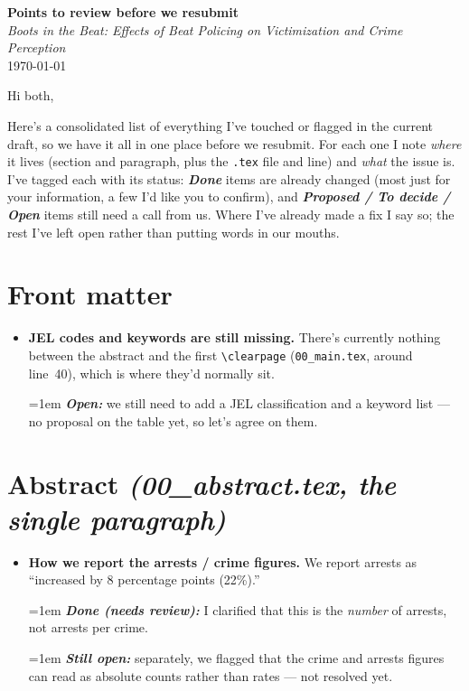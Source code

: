 \documentclass[11pt]{article}
\newcommand{\where}[1]{{\small\textit{#1}}}
\newcommand{\fix}[1]{\smallskip\par\hangindent=1em \textbf{\itshape #1}}
\begin{document}
\begin{center}
{\Large\bfseries Points to review before we resubmit}\\[3pt]
{\normalsize\itshape Boots in the Beat: Effects of Beat Policing on Victimization and Crime Perception}\\[3pt]
{\small \today}
\end{center}

\vspace{4pt}

Hi both,

Here's a consolidated list of everything I've touched or flagged in the current draft, so we have it all in one place before we resubmit. For each one I note \emph{where} it lives (section and paragraph, plus the \texttt{.tex} file and line) and \emph{what} the issue is. I've tagged each with its status: \textbf{\itshape Done} items are already changed (most just for your information, a few I'd like you to confirm), and \textbf{\itshape Proposed / To decide / Open} items still need a call from us. Where I've already made a fix I say so; the rest I've left open rather than putting words in our mouths.

\section*{Front matter}
\begin{itemize}
\item \textbf{JEL codes and keywords are still missing.} There's currently nothing between the abstract and the first \texttt{\textbackslash clearpage} (\texttt{00\_main.tex}, around line~40), which is where they'd normally sit.
\fix{Open:} we still need to add a JEL classification and a keyword list --- no proposal on the table yet, so let's agree on them.
\end{itemize}

\section*{Abstract \where{(00\_abstract.tex, the single paragraph)}}
\begin{itemize}
\item \textbf{How we report the arrests / crime figures.} We report arrests as ``increased by 8 percentage points (22\%).''
\fix{Done (needs review):} I clarified that this is the \emph{number} of arrests, not arrests per crime.
\fix{Still open:} separately, we flagged that the crime and arrests figures can read as absolute counts rather than rates --- not resolved yet.
\end{itemize}
\end{document}
